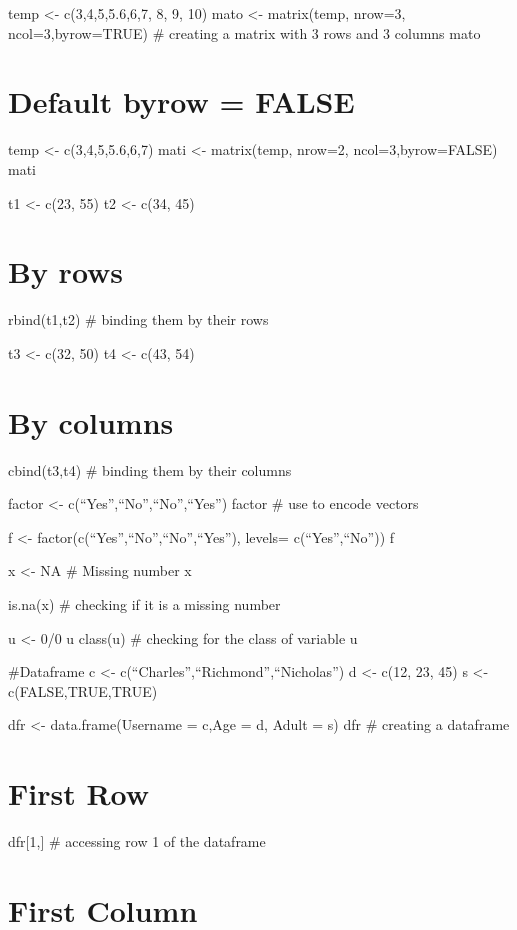 \documentclass[
]{article}
\begin{document}
temp \textless- c(3,4,5,5.6,6,7, 8, 9, 10) mato \textless- matrix(temp,
nrow=3, ncol=3,byrow=TRUE) \# creating a matrix with 3 rows and 3
columns mato

\section{Default byrow = FALSE}\label{default-byrow-false}

temp \textless- c(3,4,5,5.6,6,7) mati \textless- matrix(temp, nrow=2,
ncol=3,byrow=FALSE) mati

t1 \textless- c(23, 55) t2 \textless- c(34, 45)

\section{By rows}\label{by-rows}

rbind(t1,t2) \# binding them by their rows

t3 \textless- c(32, 50) t4 \textless- c(43, 54)

\section{By columns}\label{by-columns}

cbind(t3,t4) \# binding them by their columns

factor \textless- c(``Yes'',``No'',``No'',``Yes'') factor \# use to
encode vectors

f \textless- factor(c(``Yes'',``No'',``No'',``Yes''), levels=
c(``Yes'',``No'')) f

x \textless- NA \# Missing number x

is.na(x) \# checking if it is a missing number

u \textless- 0/0 u class(u) \# checking for the class of variable u

\#Dataframe c \textless- c(``Charles'',``Richmond'',``Nicholas'') d
\textless- c(12, 23, 45) s \textless- c(FALSE,TRUE,TRUE)

dfr \textless- data.frame(Username = c,Age = d, Adult = s) dfr \#
creating a dataframe

\section{First Row}\label{first-row}

dfr{[}1,{]} \# accessing row 1 of the dataframe

\section{First Column}\label{first-column}
\end{document}
